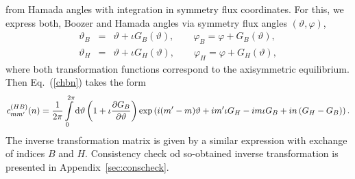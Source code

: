 \documentclass[12pt]{article}
\newcommand{\bea}[1]{\begin{eqnarray} \label{#1}}
\newcommand{\eea}{\end{eqnarray}}
\newcommand{\eq}[1]{(\ref{#1})}
\newcommand{\difp}[2]{\frac{\partial #1}{\partial #2}}
\newcommand{\rd}{{\rm d}}
\begin{document}
from Hamada angles with integration in symmetry flux coordinates. For this, we express both, Boozer and Hamada angles
via symmetry flux angles $(\vartheta,\varphi)$,
\bea{booz_viasym}
\vartheta_B &=&\vartheta+\iota G_B(\vartheta), \qquad \varphi_B=\varphi+G_B(\vartheta),
\nonumber
\\
\vartheta_H &=&\vartheta+\iota G_H(\vartheta), \qquad \varphi_H=\varphi+G_H(\vartheta),
\eea
where both transformation functions correspond to the axisymmetric equilibrium. Then Eq.~\eq{chbn} takes the form
\bea{chbn_sym}
c_{mm^\prime}^{(HB)}(n)
=
\frac{1}{2\pi}\int\limits_{0}^{2\pi}\rd \vartheta\left(1+\iota \difp{G_B}{\vartheta}\right)
\exp\left(i(m^\prime-m)\vartheta+im^\prime\iota G_H-im\iota G_B+in \left(G_H-G_B\right)\right).
\eea
The inverse transformation matrix is given by a similar expression with exchange of indices $B$ and $H$.
Consistency check od so-obtained inverse transformation is presented in Appendix~\ref{sec:conscheck}.
\end{document}
